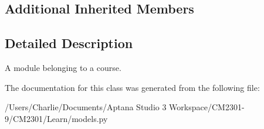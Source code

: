\subsection*{Additional Inherited Members}


\subsection{Detailed Description}
A module belonging to a course. 

The documentation for this class was generated from the following file\-:\begin{DoxyCompactItemize}
\item 
/\-Users/\-Charlie/\-Documents/\-Aptana Studio 3 Workspace/\-C\-M2301-\/9/\-C\-M2301/\-Learn/models.\-py\end{DoxyCompactItemize}
